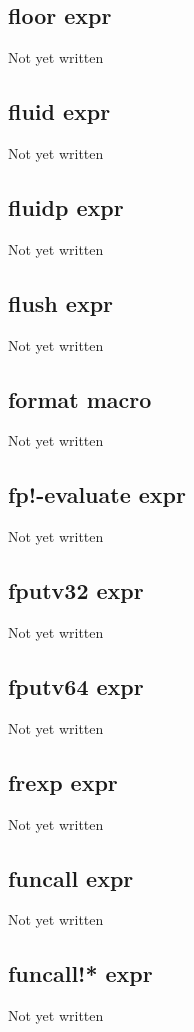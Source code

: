 \documentclass[a4paper,11pt]{article}
\begin{document}
{\subsection{\ttfamily floor expr}
Not yet written

\subsection{\ttfamily fluid expr}
Not yet written

\subsection{\ttfamily fluidp expr}
Not yet written

\subsection{\ttfamily flush expr}
Not yet written

\subsection{\ttfamily format macro}
Not yet written

\subsection{\ttfamily fp!-evaluate expr}
Not yet written

\subsection{\ttfamily fputv32 expr}
Not yet written

\subsection{\ttfamily fputv64 expr}
Not yet written

\subsection{\ttfamily frexp expr}
Not yet written

\subsection{\ttfamily funcall expr}
Not yet written

\subsection{\ttfamily funcall!* expr}
Not yet written

}
\end{document}
